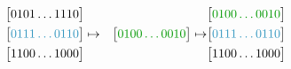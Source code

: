 \begin{alignat*}{3}
    &\big[0101\dots1110\big]         &{}                                                                                     &\big[\textcolor{green!60!black}{0100\dots0010}\big] \\
    &\big[\textcolor{cyan!75!black}{0111\dots0110}\big] \mapsto &\big[\textcolor{green!60!black}{0100\dots0010}\big] \mapsto &\big[\textcolor{cyan!75!black}{0111\dots0110}\big] \\
    &\big[1100\dots1000\big]         &{}                                                                                     &\big[1100\dots1000\big] 
\end{alignat*}